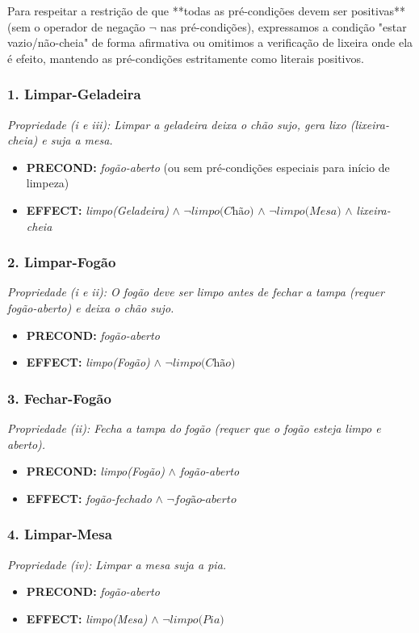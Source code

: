 \documentclass[a4paper,12pt]{article}
\begin{document}
Para respeitar a restrição de que **todas as pré-condições devem ser positivas** (sem o operador de negação $\neg$ nas pré-condições), expressamos a condição "estar vazio/não-cheia" de forma afirmativa ou omitimos a verificação de lixeira onde ela é efeito, mantendo as pré-condições estritamente como literais positivos.

\subsubsection*{1. Limpar-Geladeira}
\textit{Propriedade (i e iii): Limpar a geladeira deixa o chão sujo, gera lixo (lixeira-cheia) e suja a mesa.}
\begin{itemize}
	\item \textbf{PRECOND:} \textit{fogão-aberto} (ou sem pré-condições especiais para início de limpeza)
	\item \textbf{EFFECT:} \textit{limpo(Geladeira)} $\wedge$ $\neg \textit{limpo(Chão)}$ $\wedge$ $\neg \textit{limpo(Mesa)}$ $\wedge$ \textit{lixeira-cheia}
\end{itemize}

\subsubsection*{2. Limpar-Fogão}
\textit{Propriedade (i e ii): O fogão deve ser limpo antes de fechar a tampa (requer fogão-aberto) e deixa o chão sujo.}
\begin{itemize}
	\item \textbf{PRECOND:} \textit{fogão-aberto}
	\item \textbf{EFFECT:} \textit{limpo(Fogão)} $\wedge$ $\neg \textit{limpo(Chão)}$
\end{itemize}

\subsubsection*{3. Fechar-Fogão}
\textit{Propriedade (ii): Fecha a tampa do fogão (requer que o fogão esteja limpo e aberto).}
\begin{itemize}
	\item \textbf{PRECOND:} \textit{limpo(Fogão)} $\wedge$ \textit{fogão-aberto}
	\item \textbf{EFFECT:} \textit{fogão-fechado} $\wedge$ $\neg \textit{fogão-aberto}$
\end{itemize}

\subsubsection*{4. Limpar-Mesa}
\textit{Propriedade (iv): Limpar a mesa suja a pia.}
\begin{itemize}
	\item \textbf{PRECOND:} \textit{fogão-aberto}
	\item \textbf{EFFECT:} \textit{limpo(Mesa)} $\wedge$ $\neg \textit{limpo(Pia)}$
\end{itemize}
\end{document}
